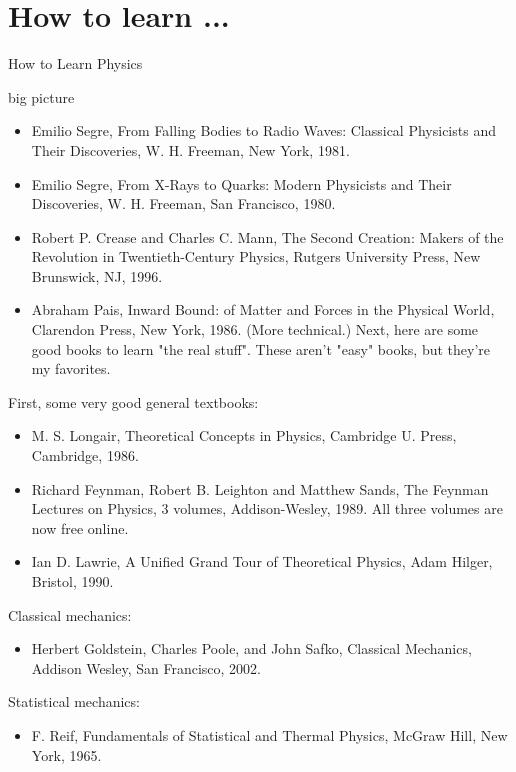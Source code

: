 \documentclass[10pt,a4paper]{book}
\theoremstyle{definition}
\begin{document}
\chapter{How to learn ...}
How to Learn Physics

big picture
\begin{itemize}
\item Emilio Segre, From Falling Bodies to Radio Waves: Classical Physicists and Their Discoveries, W. H. Freeman, New York, 1981.

\item Emilio Segre, From X-Rays to Quarks: Modern Physicists and Their Discoveries, W. H. Freeman, San Francisco, 1980.

\item Robert P. Crease and Charles C. Mann, The Second Creation: Makers of the Revolution in Twentieth-Century Physics, Rutgers University Press, New Brunswick, NJ, 1996.

\item Abraham Pais, Inward Bound: of Matter and Forces in the Physical World, Clarendon Press, New York, 1986. (More technical.)
Next, here are some good books to learn "the real stuff". These aren't "easy" books, but they're my favorites.
\end{itemize}

First, some very good general textbooks:
\begin{itemize}
\item M. S. Longair, Theoretical Concepts in Physics, Cambridge U. Press, Cambridge, 1986.

\item Richard Feynman, Robert B. Leighton and Matthew Sands, The Feynman Lectures on Physics, 3 volumes, Addison-Wesley, 1989. All three volumes are now free online.
\item Ian D. Lawrie, A Unified Grand Tour of Theoretical Physics, Adam Hilger, Bristol, 1990.
\end{itemize}

Classical mechanics:
\begin{itemize}
\item Herbert Goldstein, Charles Poole, and John Safko, Classical Mechanics, Addison Wesley, San Francisco, 2002.
\end{itemize}

Statistical mechanics:
\begin{itemize}
\item F. Reif, Fundamentals of Statistical and Thermal Physics, McGraw Hill, New York, 1965.
\end{itemize}
\end{document}
